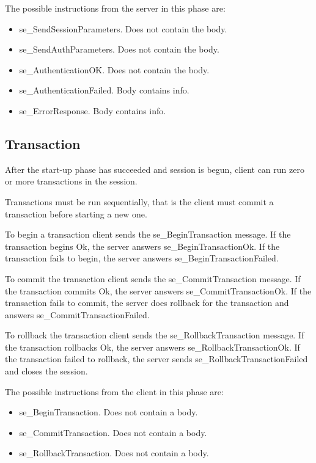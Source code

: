 \documentclass[a4paper,12pt]{article}
\begin{document}
The possible instructions from the server in this phase are:
\begin{itemize}
\item se\_SendSessionParameters. Does not contain the body.
\item se\_SendAuthParameters. Does not contain the body.
\item se\_AuthenticationOK. Does not contain the body.
\item se\_AuthenticationFailed. Body contains info.
\item se\_ErrorResponse. Body contains info.
\end{itemize}

\subsection{Transaction}

After the start-up phase has succeeded and session is begun, client can run zero or more transactions in the session.

Transactions must be run sequentially, that is the client must commit a transaction before starting a new one.

To begin a transaction client sends the se\_BeginTransaction message. If the transaction begins Ok, the server answers se\_BeginTransactionOk. If the transaction fails to begin, the server answers se\_BeginTransactionFailed.

To commit the transaction client sends the se\_CommitTransaction message. If the transaction commits Ok, the server answers se\_CommitTransactionOk. If the transaction fails to commit, the server does rollback for the transaction and answers se\_CommitTransactionFailed.

To rollback the transaction client sends the se\_RollbackTransaction message. If the transaction rollbacks Ok, the server answers se\_RollbackTransactionOk. If the transaction failed to rollback, the server sends se\_RollbackTransactionFailed and closes the session.

The possible instructions from the client in this phase are:
\begin{itemize} 
\item se\_BeginTransaction. Does not contain a body.
\item se\_CommitTransaction. Does not contain a body.
\item se\_RollbackTransaction. Does not contain a body.
\end{itemize}
\end{document}
